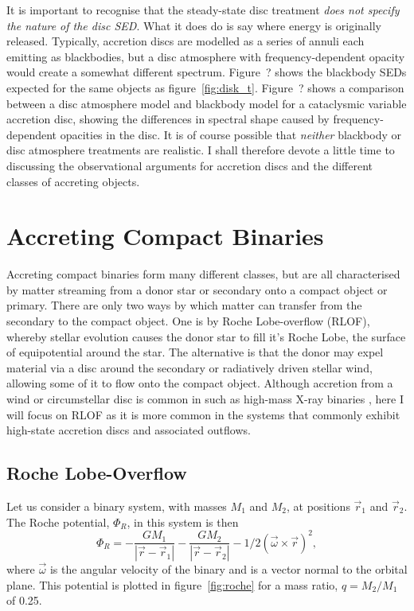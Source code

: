 It is important to recognise that the steady-state disc treatment
{\sl does not specify the nature of the disc SED}. What it does do is 
say where energy is originally released. Typically,
accretion discs are modelled as a series of annuli each emitting 
as blackbodies, but a disc atmosphere with frequency-dependent
opacity would create a somewhat different spectrum. 
Figure~? shows the blackbody SEDs expected for the same objects as figure~\ref{fig:disk_t}.
Figure~? shows a comparison between a disc atmosphere model and
blackbody model for a cataclysmic variable accretion disc, showing
the differences in spectral shape caused by frequency-dependent opacities
in the disc. It is of course possible that {\em neither} blackbody or disc atmosphere
treatments are realistic. I shall therefore devote a little time to discussing
the observational arguments for accretion discs and the different classes of accreting 
objects.


\section{Accreting Compact Binaries}

Accreting compact binaries form many different classes, 
but are all characterised by matter streaming from a donor star or secondary
onto a compact object or primary.
There are only two ways by which matter can transfer 
from the secondary to the compact object. One is by Roche Lobe-overflow (RLOF),
whereby stellar evolution causes the donor star to fill it's Roche Lobe, the surface
of equipotential around the star. The alternative is that the donor may expel
material via a disc around the secondary or radiatively driven stellar wind, 
allowing some of it to flow onto the compact object. 
Although accretion from a wind or circumstellar disc is common in 
such as high-mass X-ray binaries \citep[HMXBs; e.g.][]{bartlett2013}, here I will focus on 
RLOF as it is more common in the systems that commonly exhibit high-state accretion discs
and associated outflows.

\subsection{Roche Lobe-Overflow}

Let us consider a binary system, with masses $M_1$ and $M_2$, at positions
$\vec{r}_1$ and $\vec{r}_2$. The Roche potential, $\Phi_R$, in this system 
is then
\begin{equation}
\Phi_R = - \frac{GM_1}{| \vec{r} - \vec{r}_1 |} - 
\frac{GM_2}{| \vec{r} - \vec{r}_2 |} - 1/2 (\vec{\omega} \times
 \vec{r})^2,
\label{eq:roche}
\end{equation} 
where $\vec{\omega}$ is the angular velocity of the binary and is a vector normal to
the orbital plane. This potential is plotted in figure~\ref{fig:roche} for a mass ratio, 
$q = M_2 / M_1$ of 0.25.

